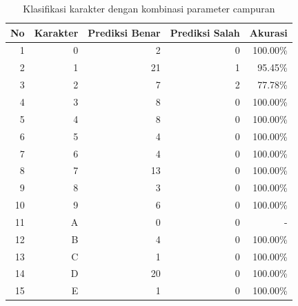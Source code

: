 \begin{longtable}[c]{|r|r|r|r|r|}
	\caption{Klasifikasi karakter dengan kombinasi parameter campuran}
	\label{tab:hasilklasifikasiselCampuran}\\
	\hline
	\textbf{No} & \textbf{Karakter} & \textbf{Prediksi Benar} & \textbf{Prediksi Salah} & \textbf{Akurasi} \\ \hline
	\endhead
	1           & 0                 & 2                       & 0                       &100.00\%            \\ \hline
	2           & 1                 & 21                       & 1                       &95.45\%            \\ \hline
	3           & 2                 & 7                       & 2                       &77.78\%            \\ \hline
	4           & 3                 & 8                       & 0                       &100.00\%            \\ \hline
	5           & 4                 & 8                       & 0                       &100.00\%            \\ \hline
	6           & 5                 & 4                       & 0                       &100.00\%            \\ \hline
	7           & 6                 & 4                       & 0                       &100.00\%            \\ \hline
	8           & 7                 & 13                       & 0                       &100.00\%            \\ \hline
	9           & 8                 & 3                       & 0                       &100.00\%            \\ \hline
	10           & 9                 & 6                       & 0                       &100.00\%            \\ \hline
	11           & A                 & 0                       & 0                       & -            \\ \hline
	12           & B                 & 4                       & 0                       &100.00\%            \\ \hline
	13           & C                 & 1                       & 0                       &100.00\%            \\ \hline
	14           & D                 & 20                       & 0                       &100.00\%            \\ \hline
	15           & E                 & 1                       & 0                       &100.00\%            \\ \hline

\end{longtable}
